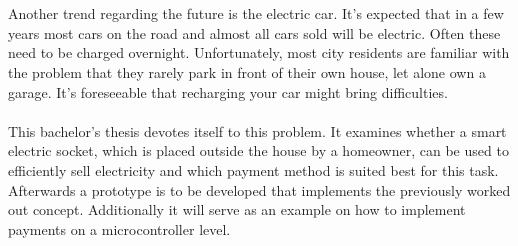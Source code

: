\\\\
Another trend regarding the future is the electric car. It's expected that in a few years most cars on the road and almost all cars sold will be electric. Often these need to be charged overnight. Unfortunately, most city residents are familiar with the problem that they rarely park in front of their own house, let alone own a garage. It's foreseeable that recharging your car might bring difficulties.
\\\\ 
This bachelor's thesis devotes itself to this problem. It examines whether a smart electric socket, which is placed outside the house by a homeowner, can be used to efficiently sell electricity and which payment method is suited best for this task. Afterwards a prototype is to be developed that implements the previously worked out concept. Additionally it will serve as an example on how to implement  payments on a microcontroller level.